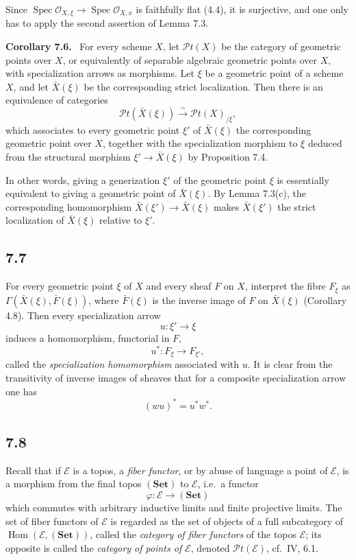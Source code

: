 \documentclass[11pt]{article}
\newcommand{\Oo}{\mathcal{O}}
\newcommand{\E}{\mathcal{E}}
\newcommand{\Pt}{\mathcal{P}t}
\newcommand{\Spec}{\operatorname{Spec}}
\newcommand{\Hom}{\operatorname{Hom}}
\newcommand{\ie}{i.e.\ }
\newcommand{\cf}{cf.\ }
\newenvironment{statement}[1]{\par\medskip\noindent\textbf{#1.}\ }{\par\medskip}
\begin{document}
Since \(\Spec\Oo_{X,\xi}\to\Spec\Oo_{X,x}\) is faithfully flat (4.4), it is surjective, and one only has to apply the second assertion of Lemma 7.3.

\begin{statement}{Corollary 7.6}
For every scheme \(X\), let \(\Pt(X)\) be the category of geometric points over \(X\), or equivalently of separable algebraic geometric points over \(X\), with specialization arrows as morphisms. Let \(\xi\) be a geometric point of a scheme \(X\), and let \(\bar X(\xi)\) be the corresponding strict localization. Then there is an equivalence of categories
\[
\Pt(\bar X(\xi))\xrightarrow{\sim}\Pt(X)_{/\xi},
\]
which associates to every geometric point \(\xi'\) of \(\bar X(\xi)\) the corresponding geometric point over \(X\), together with the specialization morphism to \(\xi\) deduced from the structural morphism \(\xi'\to\bar X(\xi)\) by Proposition 7.4.
\end{statement}

In other words, giving a generization \(\xi'\) of the geometric point \(\xi\) is essentially equivalent to giving a geometric point of \(\bar X(\xi)\). By Lemma 7.3(c), the corresponding homomorphism \(\bar X(\xi')\to\bar X(\xi)\) makes \(\bar X(\xi')\) the strict localization of \(\bar X(\xi)\) relative to \(\xi'\).

\subsection*{7.7}
For every geometric point \(\xi\) of \(X\) and every sheaf \(F\) on \(X\), interpret the fibre \(F_\xi\) as \(\Gamma(\bar X(\xi),\bar F(\xi))\), where \(\bar F(\xi)\) is the inverse image of \(F\) on \(\bar X(\xi)\) (Corollary 4.8). Then every specialization arrow
\[
u:\xi'\longrightarrow \xi
\]
induces a homomorphism, functorial in \(F\),
\[
u^*:F_\xi\longrightarrow F_{\xi'},
\]
called the \emph{specialization homomorphism} associated with \(u\). It is clear from the transitivity of inverse images of sheaves that for a composite specialization arrow one has
\[
(wu)^*=u^*w^*.
\]

\subsection*{7.8}
Recall that if \(\E\) is a topos, a \emph{fiber functor}, or by abuse of language a point of \(\E\), is a morphism from the final topos \((\mathbf{Set})\) to \(\E\), \ie a functor
\[
\varphi:\E\longrightarrow (\mathbf{Set})
\]
which commutes with arbitrary inductive limits and finite projective limits. The set of fiber functors of \(\E\) is regarded as the set of objects of a full subcategory of \(\Hom(\E,(\mathbf{Set}))\), called the \emph{category of fiber functors} of the topos \(\E\); its opposite is called the \emph{category of points of \(\E\)}, denoted \(\Pt(\E)\), \cf IV, 6.1.
\end{document}

